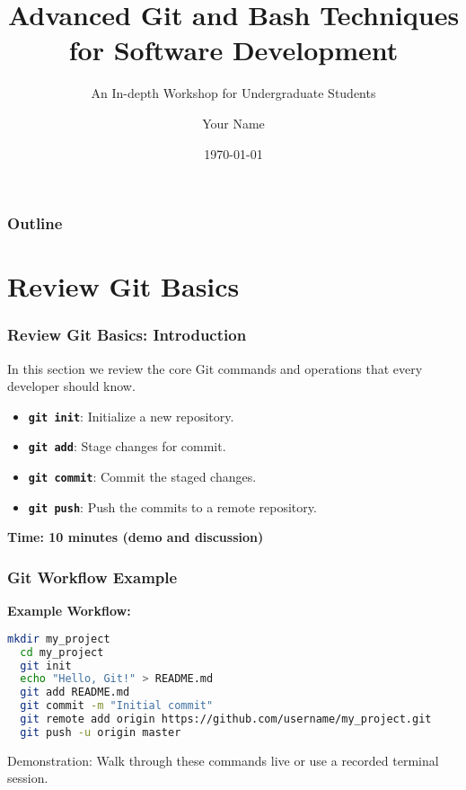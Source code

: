 \documentclass{beamer}
\title[Advanced Git]{Advanced Git and Bash Techniques for Software Development}
\subtitle{An In-depth Workshop for Undergraduate Students}
\author{Your Name}
\institute[Your Institution]{Your Institution, Department of Computer Science}
\date{\today}
\begin{document}
\begin{frame}
	\titlepage
\end{frame}

\begin{frame}
	\frametitle{Outline}
	\tableofcontents
\end{frame}

\section{Review Git Basics}
\begin{frame}[fragile]
	\frametitle{Review Git Basics: Introduction}
	In this section we review the core Git commands and operations that every developer should know. \pause
	\begin{itemize}
		\item \textbf{\texttt{git init}}: Initialize a new repository.
		\item \textbf{\texttt{git add}}: Stage changes for commit.
		\item \textbf{\texttt{git commit}}: Commit the staged changes.
		\item \textbf{\texttt{git push}}: Push the commits to a remote repository.
	\end{itemize}
	\vfill
	\textbf{Time: 10 minutes (demo and discussion)}
\end{frame}

\begin{frame}[fragile]
	\frametitle{Git Workflow Example}
	\textbf{Example Workflow:}
	\begin{lstlisting}[language=bash]
  mkdir my_project
  cd my_project
  git init
  echo "Hello, Git!" > README.md
  git add README.md
  git commit -m "Initial commit"
  git remote add origin https://github.com/username/my_project.git
  git push -u origin master
  \end{lstlisting}
	\vfill
	\alert{Demonstration:} Walk through these commands live or use a recorded terminal session.
\end{frame}

\end{document}
